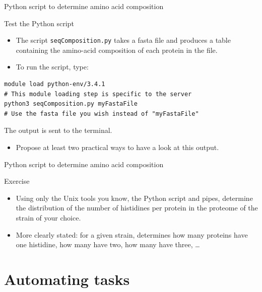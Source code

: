 \documentclass[big]{beamer}
\begin{document}
\begin{frame}[fragile,label=sec-3-8]{Python script to determine amino acid composition}
 \begin{block}{Test the Python script}
\begin{itemize}
\item The script \texttt{seqComposition.py} takes a fasta file and produces a table
containing the amino-acid composition of each protein in the file.
\item To run the script, type:
\end{itemize}
\begin{verbatim}
module load python-env/3.4.1   
# This module loading step is specific to the server
python3 seqComposition.py myFastaFile 
# Use the fasta file you wish instead of "myFastaFile"
\end{verbatim}
The output is sent to the terminal.
\begin{itemize}
\item Propose at least two practical ways to have a look at this output.
\end{itemize}
\end{block}
\end{frame}
\begin{frame}[label=sec-3-9]{Python script to determine amino acid composition}
\begin{block}{Exercise}
\begin{itemize}
\item Using only the \alert{Unix tools} you know, the \alert{Python script} and \alert{pipes},
determine the distribution of the number of histidines per protein in the
proteome of the strain of your choice.
\item More clearly stated: for a given strain, determines how many proteins have
one histidine, how many have two, how many have three, \ldots{}
\end{itemize}
\end{block}
\end{frame}
\section{Automating tasks}
\label{sec-4}
\end{document}
